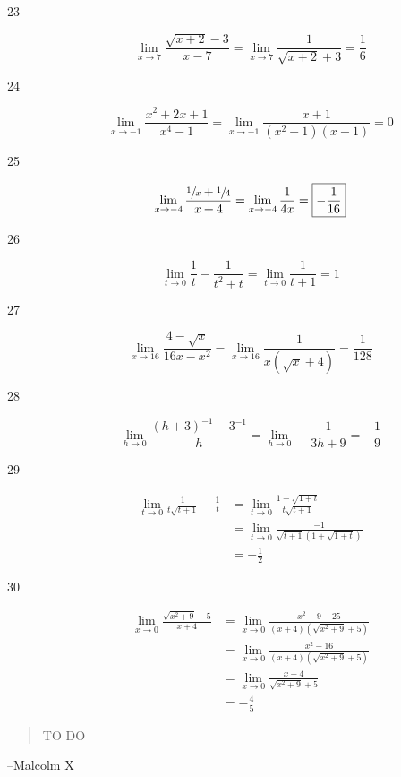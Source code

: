 \documentclass[letterpaper, landscape]{exam}
\begin{document}
\begin{description}
      \item[23]
        \[
          \lim_{x \to 7} \frac{\sqrt{x+2}-3}{x-7} 
            = \lim_{x \to 7} \frac{1}{\sqrt{x + 2} + 3} 
            = \boxed{ \frac{1}{6} } 
        \]

      \item[24]
        \[
          \lim_{x \to -1} \frac{x^2+2 x+1}{x^4-1} 
            = \lim_{x \to -1} \frac{x+1}{(x^2+1)(x-1)} 
            = \boxed{ 0 } 
        \]

      \item[25]
        \[
          \lim_{x \to -4} \frac{\sfrac{1}{x}+\sfrac{1}{4}}{x+4} 
            = \lim_{x \to -4} \frac{1}{4 x} 
            = \boxed{ -\frac{1}{16} } 
        \]

      \item[26]
        \[
          \lim_{t \to 0} \frac{1}{t}-\frac{1}{t^2+t} 
            = \lim_{t \to 0} \frac{1}{t + 1} 
            = \boxed{ 1 } 
        \]

      \item[27]
        \[
          \lim_{x \to 16} \frac{4-\sqrt{x}}{16 x-x^2} 
            = \lim_{x \to 16} \frac{1}{x (\sqrt{x} + 4)} 
            = \boxed{ \frac{1}{128} } 
        \]

      \item[28]
        \[
          \lim_{h \to 0} \frac{(h+3)^{-1}-3^{-1}}{h} 
            = \lim_{h \to 0} -\frac{1}{3 h+9} 
            = \boxed{ - \frac{1}{9} } 
        \]

      \item[29]
        \begin{align*}
          \lim_{t \to 0} \frac{1}{t \sqrt{t+1}}-\frac{1}{t} 
            & = \lim_{t \to 0} \frac{1 - \sqrt{1 + t}}{t \sqrt{t+1}} \\
            & = \lim_{t \to 0} \frac{-1}{\sqrt{t+1} (1 + \sqrt{1 + t})} \\
            & = \boxed{ - \frac{1}{2} }
        \end{align*}

      \item[30]
        \begin{align*}
          \lim_{x \to 0} \frac{\sqrt{x^2+9}-5}{x+4} 
            &= \lim_{x \to 0} \frac{x^2+9-25}{\left(x+4\right) \left(\sqrt{x^2+9}+5 \right)} \\
            & = \lim_{x \to 0} \frac{x^2-16}{\left(x+4\right) \left(\sqrt{x^2+9}+5 \right)} \\
            & = \lim_{x \to 0} \frac{x-4}{\sqrt{x^2+9}+5} \\
            & = \boxed{ - \frac{4}{5} }
        \end{align*}

    \end{description}


  \else
    \vspace{11 cm}
    \begin{quote}
      \begin{em}
        TO DO
      \end{em}
    \end{quote}
    \hspace{1 cm} --Malcolm X
  \fi
\end{document}
